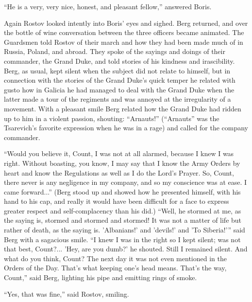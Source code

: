 ``He is a very, very nice, honest, and pleasant fellow,''
answered Boris.

Again Rostov looked intently into Boris' eyes and sighed. Berg
returned, and over the bottle of wine conversation between the
three officers became animated. The Guardsmen told Rostov of
their march and how they had been made much of in Russia, Poland,
and abroad. They spoke of the sayings and doings of their
commander, the Grand Duke, and told stories of his kindness and
irascibility. Berg, as usual, kept silent when the subject did
not relate to himself, but in connection with the stories of the
Grand Duke's quick temper he related with gusto how in Galicia he
had managed to deal with the Grand Duke when the latter made a
tour of the regiments and was annoyed at the irregularity of a
movement. With a pleasant smile Berg related how the Grand Duke
had ridden up to him in a violent passion, shouting: ``Arnauts!''
(``Arnauts'' was the Tsarevich's favorite expression when he was
in a rage) and called for the company commander.

``Would you believe it, Count, I was not at all alarmed, because
I knew I was right. Without boasting, you know, I may say that I
know the Army Orders by heart and know the Regulations as well as
I do the Lord's Prayer. So, Count, there never is any negligence
in my company, and so my conscience was at ease. I came
forward...'' (Berg stood up and showed how he presented himself,
with his hand to his cap, and really it would have been difficult
for a face to express greater respect and self-complacency than
his did.) ``Well, he stormed at me, as the saying is, stormed and
stormed and stormed! It was not a matter of life but rather of
death, as the saying is. 'Albanians!' and 'devils!' and 'To
Siberia!'{}'' said Berg with a sagacious smile. ``I knew I was in
the right so I kept silent; was not that best, Count?... 'Hey,
are you dumb?' he shouted. Still I remained silent. And what do
you think, Count? The next day it was not even mentioned in the
Orders of the Day. That's what keeping one's head means. That's
the way, Count,'' said Berg, lighting his pipe and emitting rings
of smoke.

``Yes, that was fine,'' said Rostov, smiling.

